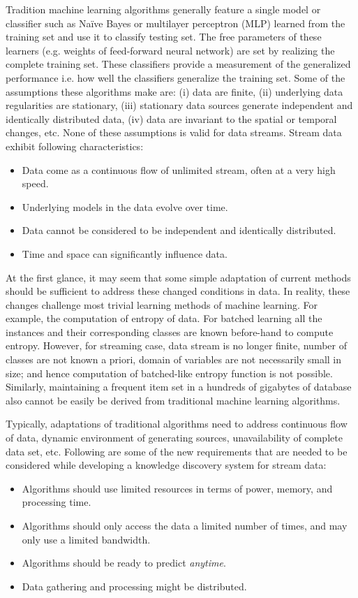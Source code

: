 Tradition machine learning algorithms generally feature a single model or classifier such as Na\"ive Bayes or multilayer perceptron (MLP) learned from the training set and use it to classify testing set. The free parameters of these learners (e.g. weights of feed-forward neural network) are set by realizing the complete training set. These classifiers provide a measurement of the generalized performance i.e. how well the classifiers generalize the training set. Some of the assumptions these algorithms make are: (i) data are finite, (ii) underlying data regularities are stationary, (iii) stationary data sources generate independent and identically distributed data, (iv) data are invariant to the spatial or temporal changes, etc. None of these assumptions is valid for data streams. Stream data exhibit following characteristics: 
\begin{itemize}
    \item Data come as a continuous flow of unlimited stream, often at a very high speed.
    \item Underlying models in the data evolve over time.
    \item Data cannot be considered to be independent and identically distributed.
    \item Time and space can significantly influence data.
\end{itemize}
At the first glance, it may seem that some simple adaptation of current methods should be sufficient to address these changed conditions in data. In reality, these changes challenge most trivial learning methods of machine learning. For example, the computation of entropy of data. For batched learning all the instances and their corresponding classes are known before-hand to compute entropy. However, for streaming case, data stream is no longer finite, number of classes are not known a priori, domain of variables are not necessarily small in size; and hence computation of batched-like entropy function is not possible. Similarly, maintaining a frequent item set in a hundreds of gigabytes of database also cannot be easily be derived from traditional machine learning algorithms.

Typically, adaptations of traditional algorithms need to address continuous flow of data, dynamic environment of generating sources, unavailability of complete data set, etc. Following are some of the new requirements that are needed to be considered while developing a knowledge discovery system for stream data:
\begin{itemize}
    \item Algorithms should use limited resources in terms of power, memory, and processing time.
    \item Algorithms should only access the data a limited number of times, and may only use a limited bandwidth.
    \item Algorithms should be ready to predict {\it anytime}. 
    \item Data gathering and processing might be distributed.
\end{itemize}

